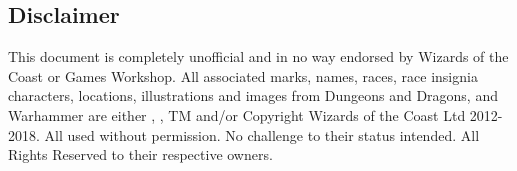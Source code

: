 \documentclass[CMPUT-404-Notes.tex]{subfiles}
\begin{document}
\subsection*{Disclaimer}
This document is completely unofficial and in no way endorsed by Wizards of the Coast or Games Workshop. All associated marks, names, races, race insignia characters, locations, illustrations and images from Dungeons and Dragons, and Warhammer are either \textregistered, \textcopyright, TM and/or Copyright Wizards of the Coast Ltd 2012-2018. All used without permission. No challenge to their status intended. All Rights Reserved to their respective owners.
\end{document}
